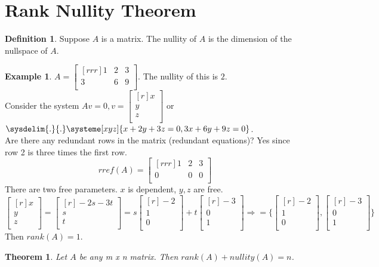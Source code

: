 \documentclass{report}
\theoremstyle{plain}
\newtheorem*{thrm}{Theorem}
\theoremstyle{definition}
\newtheorem*{ex}{Example}
\newtheorem*{defn}{Definition}
\theoremstyle{plain}
\begin{document}
\section{Rank Nullity Theorem}
\begin{defn}
Suppose $A$ is a matrix. The nullity of $A$ is the dimension of the nullspace of $A$.
\end{defn}
\begin{ex}
$A=\begin{bmatrix}[rrr]1&2&3\\3&6&9\\\end{bmatrix}$. The nullity of this is $2$.\\
Consider the system $Av=0, v=\begin{bmatrix}[r]x\\y\\z\\\end{bmatrix}$ or $\sysdelim{.}{.}\systeme[xyz]{x+2y+3z=0,3x+6y+9z=0}$.\\
Are there any redundant rows in the matrix (redundant equations)? Yes since row 2 is three times the first row.\\
\[ rref(A)=\begin{bmatrix}[rrr]1&2&3\\0&0&0\\\end{bmatrix} \]
There are two free parameters. $x$ is dependent, $y,z$ are free.\\
\[ \begin{bmatrix}[r]x\\y\\z\\\end{bmatrix} = \begin{bmatrix}[r]-2s-3t\\s\\t\\\end{bmatrix} = s\begin{bmatrix}[r]-2\\1\\0\\\end{bmatrix}+t\begin{bmatrix}[r]-3\\0\\1\\\end{bmatrix} \Rightarrow = \{\begin{bmatrix}[r]-2\\1\\0\\\end{bmatrix},\begin{bmatrix}[r]-3\\0\\1\\\end{bmatrix}\} \]
Then $rank(A)=1$.
\end{ex}
\begin{thrm}
Let $A$ be any m x n matrix. Then $rank(A)+nullity(A)=n$.
\end{thrm}
\end{document}
